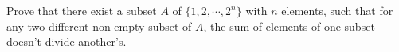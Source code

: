 Prove that there exist a subset $A$ of $\{1,2,\cdots,2^n\}$ with $n$ elements, such that for any two different non-empty subset of $A$, the sum of elements of one subset doesn't divide another's.